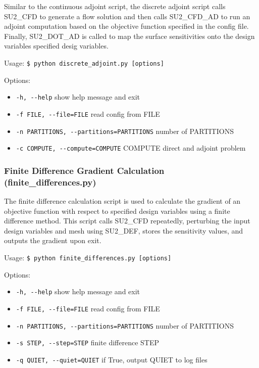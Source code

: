 \documentclass[12pt, a4paper, twoside]{article}
\begin{document}
Similar to the continuous adjoint script, the discrete adjoint script calls SU2\_CFD to generate a flow solution and then calls SU2\_CFD\_AD to run an adjoint computation based on the objective function specified in the config file. Finally, SU2\_DOT\_AD is called to map the surface sensitivities onto the design variables specified desig variables.

Usage: \verb|$ python discrete_adjoint.py [options]|

Options:
\begin{itemize}
    \item \verb|-h, --help| show help message and exit
    \item \verb|-f FILE, --file=FILE| read config from FILE
    \item \verb|-n PARTITIONS, --partitions=PARTITIONS| number of PARTITIONS
    \item \verb|-c COMPUTE, --compute=COMPUTE| COMPUTE direct and adjoint problem
\end{itemize}
    
\subsubsection{Finite Difference Gradient Calculation (finite\_differences.py)}

The finite difference calculation script is used to calculate the gradient of an objective function with respect to specified design variables using a finite difference method. This script calls SU2\_CFD repeatedly, perturbing the input design variables and mesh using SU2\_DEF, stores the sensitivity values, and outputs the gradient upon exit.

Usage: \verb|$ python finite_differences.py [options]|

Options:

\begin{itemize}
    \item \verb|-h, --help| show help message and exit
    \item \verb|-f FILE, --file=FILE| read config from FILE
    \item \verb|-n PARTITIONS, --partitions=PARTITIONS| number of PARTITIONS
    \item \verb|-s STEP, --step=STEP| finite difference STEP
    \item \verb|-q QUIET, --quiet=QUIET| if True, output QUIET to log files
\end{itemize}
    
    
   
\end{document}
